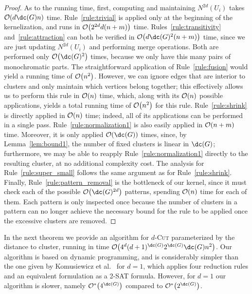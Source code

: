 \begin{proof}
    As to the running time, first, computing and maintaining $N^{2d}(U_i)$ takes $\bigO{d\dc(G)n}$ time.
    Rule~\ref{rule:trivial} is applied only at the beginning of the kernelization, and runs in $\mathcal{O}\!\left(2^{2d}d(n + m)\right)$ time.
    Rules~\ref{rule:transitivity} and~\ref{rule:attraction} can both be verified in $\bigO{d\dc(G)^2(n + m)}$ time, since we are just updating $N^{2d}(U_i)$ and performing merge operations.
    Both are performed only $\bigO{\dc(G)^2}$ times, because we only have this many pairs of monochromatic parts.
    The straightforward application of Rule~\ref{rule:fusion} would yield a running time of $\mathcal{O}\!\left(n^2\right)$. However, we can ignore edges that are interior to clusters and only maintain which vertices belong together; this effectively allows us to perform this rule in $\mathcal{O}\!\left(n\right)$ time, which, along with its $\mathcal{O}\!\left(n\right)$ possible applications, yields a total running time of $\mathcal{O}\!\left(n^2\right)$ for this rule.
    Rule~\ref{rule:shrink} is directly applied in $\mathcal{O}\!\left(n\right)$ time; indeed, all of its applications can be performed in a single pass.
    Rule~\ref{rule:normalization1} is also easily applied in $\mathcal{O}\!\left(n + m\right)$ time. Moreover, it is only applied $\bigO{\dc(G)}$ times, since, by Lemma~\ref{lem:bound1}, the number of fixed clusters is linear in $\dc(G)$; furthermore, we may be able to reapply Rule~\ref{rule:normalization1} directly to the resulting cluster, at no additional complexity cost.
    The analysis for Rule~\ref{rule:super_small} follows the same argument as for Rule~\ref{rule:shrink}.
    Finally, Rule~\ref{rule:pattern_removal} is the bottleneck of our kernel, since it must check each of the possible $\bigO{\dc(G)^{2d}}$ patterns, spending $\mathcal{O}\!\left(n\right)$ time for each of them.
    Each pattern is only inspected once because the number of clusters in a pattern can no longer achieve the necessary bound for the rule to be applied once the excessive clusters are removed.
\end{proof}

In the next theorem we provide an \FPT algorithm for \textsc{$d$-Cut} parameterized by the distance to cluster, running in time $\bigO{4^d(d+1)^{\dc(G)}2^{\dc(G)}\dc(G)n^2}$. Our algorithm is based on dynamic programming, and is considerably simpler than the one given by Komusiewicz  et al.~\cite{matching_cut_ipec} for $d=1$, which applies four reduction rules and an equivalent formulation as a 2-\textsc{SAT} formula. However, for $d=1$ our algorithm is slower, namely $\bigOs{4^{\dc( G )}}$ compared to  $\bigOs{2^{\dc( G )}}$.



